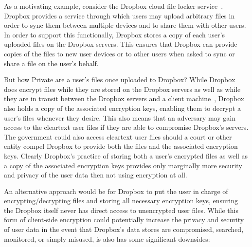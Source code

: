As a motivating example, consider the Dropbox cloud file locker
service~\cite{dropbox}. Dropbox provides a service through which users
may upload arbitrary files in order to sync them between multiple
devices and to share them with other users. In order to support this
functionally, Dropbox stores a copy of each user's uploaded files on
the Dropbox servers. This ensures that Dropbox can provide copies of
the files to new user devices or to other users when asked to sync or
share a file on the user's behalf.

But how Private are a user's files once uploaded to Dropbox? While
Dropbox does encrypt files while they are stored on the Dropbox
servers as well as while they are in transit between the Dropbox
servers and a client machine~\cite{dropbox-security}, Dropbox also
holds a copy of the associated encryption keys, enabling them to
decrypt a user's files whenever they desire. This also means that an
adversary may gain access to the cleartext user files if they are able
to compromise Dropbox's servers. The government could also access
cleartext user files should a court or other entity compel Dropbox to
provide both the files and the associated encryption keys. Clearly
Dropbox's practice of storing both a user's encrypted files as well as
a copy of the associated encryption keys provides only marginally more
security and privacy of the user data then not using encryption at
all.

An alternative approach would be for Dropbox to put the user in charge
of encrypting/decrypting files and storing all necessary encryption
keys, ensuring the Dropbox itself never has direct access to
unencrypted user files. While this form of client-side encryption
could potentially increase the privacy and security of user data in
the event that Dropbox's data stores are compromised, searched,
monitored, or simply misused, is also has some significant downsides:

